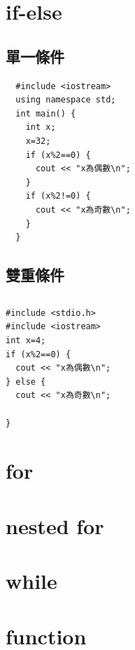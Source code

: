 \documentclass[12pt,a4paper]{article}
\begin{document}
\section{if-else}
\label{sec:org54a3a2f}

\subsection{單一條件}
\label{sec:orgb2ab9db}
\lstset{breaklines=true,language=C++,label= ,caption= ,captionpos=b,firstnumber=1,numbers=left}
\begin{lstlisting}
  #include <iostream>
  using namespace std;
  int main() {
    int x;
    x=32;
    if (x%2==0) {
      cout << "x為偶數\n";
    }
    if (x%2!=0) {
      cout << "x為奇數\n";
    }
  }
\end{lstlisting}

\subsection{雙重條件}
\label{sec:org7ea0619}

\subsection{}
\label{sec:orgb117875}
\lstset{breaklines=true,language=C,label= ,caption= ,captionpos=b,numbers=none}
\begin{lstlisting}
#include <stdio.h>
#include <iostream>
int x=4;
if (x%2==0) {
  cout << "x為偶數\n";
} else {
  cout << "x為奇數\n";

}
\end{lstlisting}

\section{for}
\label{sec:org2e036f4}

\section{nested for}
\label{sec:org2ca3b8d}

\section{while}
\label{sec:org40c10b9}

\section{function}
\label{sec:org68243c7}
\end{document}
